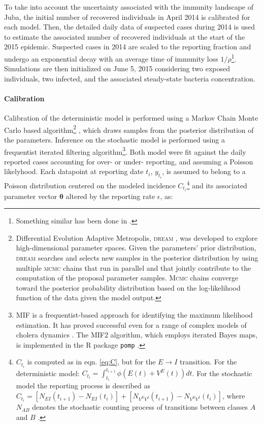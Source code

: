  
 To take into account the uncertainty associated with the immunity landscape of Juba, the initial number of recovered individuals in April 2014 is calibrated for each model. Then, the detailed daily data of suspected cases during 2014 is used to estimate the associated number of recovered individuals at the start of the 2015 epidemic. Suspected cases in 2014 are scaled to the reporting fraction and undergo an exponential decay with an average time of immunity loss $1/\rho$\footnote{Something similar has been done in \parencite{Pasetto:RealtimeProjectionsCholera:2017}.}. Simulations are then initialized on June 5, 2015 considering two exposed individuals, two infected, and the associated steady-state bacteria concentration. 
 
\paragraph{Calibration} Calibration of the deterministic model is performed using a Markov Chain Monte Carlo based algorithm\footnote{Differential Evolution Adaptive Metropolis, \textsc{dream} \parencite{Vrugt:MarkovChainMonte:2016}, was developed to explore high-dimensional parameter spaces. Given the parameters' prior distribution, \textsc{dream} searches and selects new samples in the posterior distribution by using multiple \textsc{mcmc} chains that run in parallel and that jointly contribute to the computation of the proposal parameter samples. \textsc{Mcmc} chains converge toward the posterior probability distribution based on the log-likelihood function of the data given the model output.} , which draws samples from the posterior distribution of the parameters.
Inference on the stochastic model is performed using a frequentist iterated filtering algorithm\footnote{MIF \parencite{Ionides:InferenceDynamicLatent:2015} is a frequentist-based approach for identifying the maximum likelihood estimation. It has proved successful even for a range of complex models of cholera dynamics \parencite{King:InapparentInfectionsCholera:2008,Baracchini:SeasonalityCholeraDynamics:2017}. The MIF2 algorithm, which employs iterated Bayes maps, is implemented in the R package \texttt{pomp} \parencite{King:StatisticalInferencePartially:2015}. %
}. Both model were fit against the daily reported cases accounting for over- or under- reporting, and assuming a Poisson likelyhood. Each datapoint at reporting date $t_i$,  $y_{t_i}$, is assumed to belong to a Poisson distribution centered on the modeled incidence $C_{t_i}$\footnote{$C_{t_i}$ is computed as in  eqn. \eqref{eq:C}, but for the $E \rightarrow I$ transition. For the deterministic model: $ C_{t_i} = \int_{t_i}^{t_{i+1}} \phi \left(E(t) + V^E(t)\right) dt$. For the stochastic model the reporting process is described %
as $ C_{t_i} = [N_{EI}(t_{i+1}) - N_{EI}(t_i)] + [N_{V^EV^I}(t_{i+1}) - N_{V^EV^I}(t_i)] $, where $N_{AB}$ denotes the stochastic counting process of transitions between classes $A$ and $B$ .
} and its associated parameter vector $\boldsymbol{\theta}$ altered by the reporting rate $\epsilon$, as:
